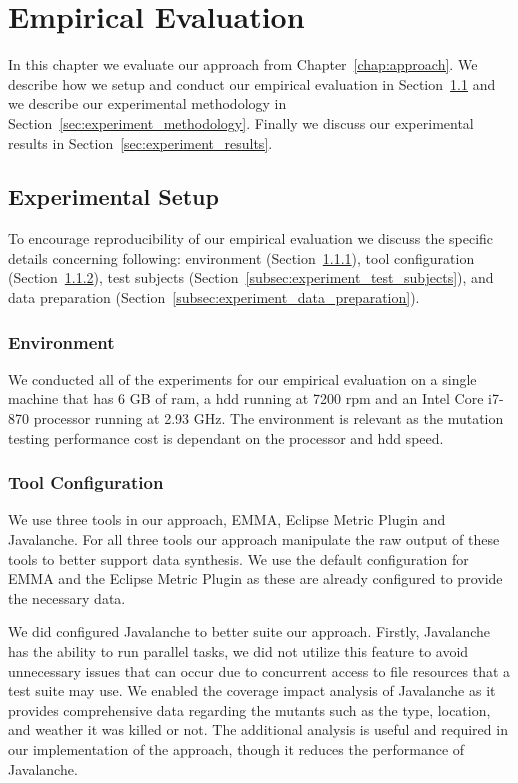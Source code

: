 \chapter{Empirical Evaluation}
\label{chap:experiment}
In this chapter we evaluate our approach from Chapter~\ref{chap:approach}. We describe how we setup and conduct our empirical evaluation in Section~\ref{sec:experiment_setup} and we describe our experimental methodology in Section~\ref{sec:experiment_methodology}. Finally we discuss our experimental results in Section~\ref{sec:experiment_results}.


\section{Experimental Setup}
\label{sec:experiment_setup}
To encourage reproducibility of our empirical evaluation we discuss the specific details concerning following: environment (Section~\ref{subsec:experiment_environment}), tool configuration (Section~\ref{subsec:experiment_tool_configuration}), test subjects (Section~\ref{subsec:experiment_test_subjects}), and data preparation (Section~\ref{subsec:experiment_data_preparation}).


\subsection{Environment}
\label{subsec:experiment_environment}
We conducted all of the experiments for our empirical evaluation on a single machine that has 6 GB of \gls{ram}, a \gls{hdd} running at 7200 \gls{rpm}  and an Intel Core i7-870 processor running at 2.93 GHz. The environment is relevant as the mutation testing performance cost is dependant on the processor and \gls{hdd} speed.


\subsection{Tool Configuration}
\label{subsec:experiment_tool_configuration}
We use three tools in our approach, EMMA, Eclipse Metric Plugin and Javalanche. For all three tools our approach manipulate the raw output of these tools to better support data synthesis. We use the default configuration for EMMA and the Eclipse Metric Plugin as these are already configured to provide the necessary data.

We did configured Javalanche to better suite our approach. Firstly, Javalanche has the ability to run parallel tasks, we did not utilize this feature to avoid unnecessary issues that can occur due to concurrent access to file resources that a test suite may use. We enabled the coverage impact analysis of Javalanche as it provides comprehensive data regarding the mutants such as the type, location, and weather it was killed or not. The additional analysis is useful and required in our implementation of the approach, though it reduces the performance of Javalanche.

